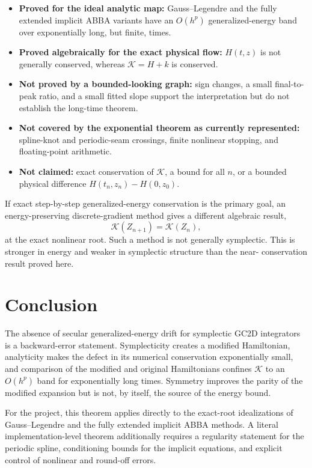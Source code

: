 \documentclass[11pt,a4paper]{article}
\theoremstyle{definition}
\theoremstyle{remark}
\newcommand{\K}{\mathcal{K}}
\begin{document}
\begin{itemize}
 \item \textbf{Proved for the ideal analytic map:} Gauss--Legendre and the
       fully extended implicit ABBA variants have an $O(h^p)$ generalized-energy
       band over exponentially long, but finite, times.
 \item \textbf{Proved algebraically for the exact physical flow:}
       $H(t,z)$ is not generally conserved, whereas $\K=H+k$ is conserved.
 \item \textbf{Not proved by a bounded-looking graph:} sign changes, a small
       final-to-peak ratio, and a small fitted slope support the interpretation
       but do not establish the long-time theorem.
 \item \textbf{Not covered by the exponential theorem as currently represented:}
       spline-knot and periodic-seam crossings, finite nonlinear
       stopping, and floating-point arithmetic.
 \item \textbf{Not claimed:} exact conservation of $\K$, a bound for all
       $n$, or a bounded physical difference $H(t_n,z_n)-H(0,z_0)$.
\end{itemize}

If exact step-by-step generalized-energy conservation is the primary goal, an
energy-preserving discrete-gradient method gives a different algebraic result,
\begin{equation}
 \K(Z_{n+1})=\K(Z_n),
 \label{eq:discrete-gradient-contrast}
\end{equation}
at the exact nonlinear root.  Such a method is not generally symplectic.  This
is stronger in energy and weaker in symplectic structure than the near-
conservation result proved here.

\section{Conclusion}

The absence of secular generalized-energy drift for symplectic GC2D
integrators is a backward-error statement.  Symplecticity creates a modified
Hamiltonian, analyticity makes the defect in its numerical conservation
exponentially small, and comparison of the modified and original Hamiltonians
confines $\K$ to an $O(h^p)$ band for exponentially long times.  Symmetry
improves the parity of the modified expansion but is not, by itself, the
source of the energy bound.

For the project, this theorem applies directly to the exact-root idealizations
of Gauss--Legendre and the fully extended implicit ABBA methods.  A literal
implementation-level theorem additionally requires a regularity statement for
the periodic spline, conditioning bounds for the implicit equations, and
explicit control of nonlinear and round-off errors.
\end{document}

